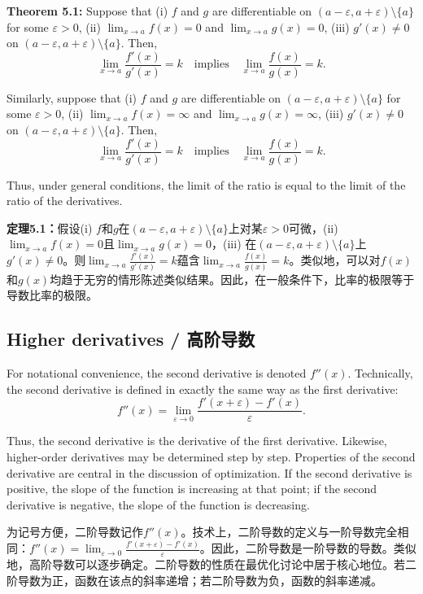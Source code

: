 \begin{original}
\textbf{Theorem 5.1:} Suppose that (i) $f$ and $g$ are differentiable on $(a - \varepsilon, a + \varepsilon) \setminus \{a\}$ for some $\varepsilon > 0$, (ii) $\lim_{x \to a} f(x) = 0$ and $\lim_{x \to a} g(x) = 0$, (iii) $g'(x) \neq 0$ on $(a - \varepsilon, a + \varepsilon) \setminus \{a\}$. Then,
\[
\lim_{x \to a} \frac{f'(x)}{g'(x)} = k \quad \text{implies} \quad \lim_{x \to a} \frac{f(x)}{g(x)} = k.
\]

Similarly, suppose that (i) $f$ and $g$ are differentiable on $(a - \varepsilon, a + \varepsilon) \setminus \{a\}$ for some $\varepsilon > 0$, (ii) $\lim_{x \to a} f(x) = \infty$ and $\lim_{x \to a} g(x) = \infty$, (iii) $g'(x) \neq 0$ on $(a - \varepsilon, a + \varepsilon) \setminus \{a\}$. Then,
\[
\lim_{x \to a} \frac{f'(x)}{g'(x)} = k \quad \text{implies} \quad \lim_{x \to a} \frac{f(x)}{g(x)} = k.
\]

Thus, under general conditions, the limit of the ratio is equal to the limit of the ratio of the derivatives.
\end{original}
\begin{translation}
\textbf{定理5.1：}假设(i) $f$和$g$在$(a - \varepsilon, a + \varepsilon) \setminus \{a\}$上对某$\varepsilon > 0$可微，(ii) $\lim_{x \to a} f(x) = 0$且$\lim_{x \to a} g(x) = 0$，(iii) 在$(a - \varepsilon, a + \varepsilon) \setminus \{a\}$上$g'(x) \neq 0$。则$\lim_{x \to a} \frac{f'(x)}{g'(x)} = k$蕴含$\lim_{x \to a} \frac{f(x)}{g(x)} = k$。类似地，可以对$f(x)$和$g(x)$均趋于无穷的情形陈述类似结果。因此，在一般条件下，比率的极限等于导数比率的极限。
\end{translation}

\subsection{Higher derivatives / 高阶导数}

\begin{original}
For notational convenience, the second derivative is denoted $f''(x)$. Technically, the second derivative is defined in exactly the same way as the first derivative:
\[
f''(x) = \lim_{\varepsilon \to 0} \frac{f'(x + \varepsilon) - f'(x)}{\varepsilon}.
\]

Thus, the second derivative is the derivative of the first derivative. Likewise, higher-order derivatives may be determined step by step. Properties of the second derivative are central in the discussion of optimization. If the second derivative is positive, the slope of the function is increasing at that point; if the second derivative is negative, the slope of the function is decreasing.
\end{original}
\begin{translation}
为记号方便，二阶导数记作$f''(x)$。技术上，二阶导数的定义与一阶导数完全相同：$f''(x) = \lim_{\varepsilon \to 0} \frac{f'(x + \varepsilon) - f'(x)}{\varepsilon}$。因此，二阶导数是一阶导数的导数。类似地，高阶导数可以逐步确定。二阶导数的性质在最优化讨论中居于核心地位。若二阶导数为正，函数在该点的斜率递增；若二阶导数为负，函数的斜率递减。
\end{translation}

